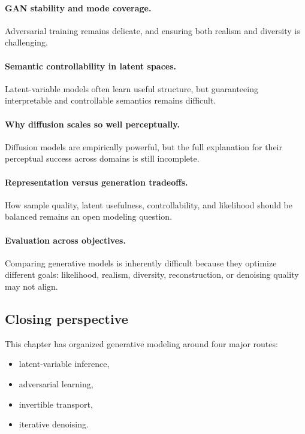 \paragraph{GAN stability and mode coverage.}
Adversarial training remains delicate, and ensuring both realism and diversity is challenging.

\paragraph{Semantic controllability in latent spaces.}
Latent-variable models often learn useful structure, but guaranteeing interpretable and controllable semantics remains difficult.

\paragraph{Why diffusion scales so well perceptually.}
Diffusion models are empirically powerful, but the full explanation for their perceptual success across domains is still incomplete.

\paragraph{Representation versus generation tradeoffs.}
How sample quality, latent usefulness, controllability, and likelihood should be balanced remains an open modeling question.

\paragraph{Evaluation across objectives.}
Comparing generative models is inherently difficult because they optimize different goals:
likelihood, realism, diversity, reconstruction, or denoising quality may not align.

\subsection*{Closing perspective}

This chapter has organized generative modeling around four major routes:
\begin{itemize}
    \item latent-variable inference,
    \item adversarial learning,
    \item invertible transport,
    \item iterative denoising.
\end{itemize}

